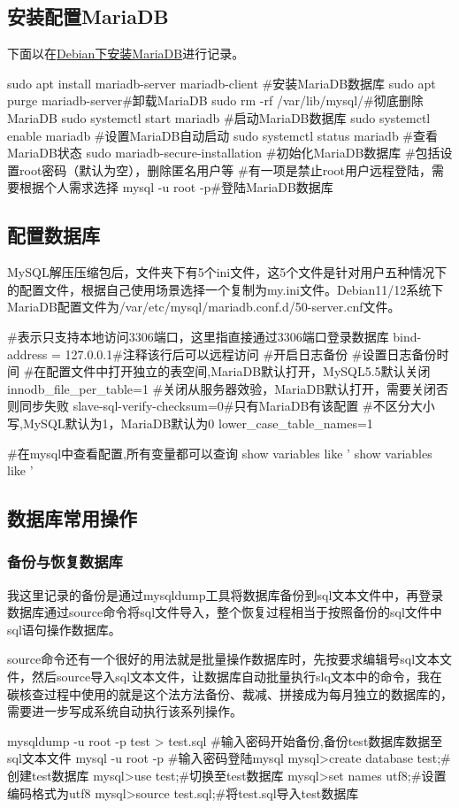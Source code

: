 \subsection{安装配置MariaDB}
下面以在\href{https://blog.csdn.net/erliujian111/article/details/135732876?spm=1001.2014.3001.5506}{Debian下安装MariaDB}进行记录。
\begin{shell}
sudo apt install mariadb-server mariadb-client
#安装MariaDB数据库
sudo apt purge mariadb-server#卸载MariaDB
sudo rm -rf /var/lib/mysql/#彻底删除MariaDB
sudo systemctl start mariadb #启动MariaDB数据库
sudo systemctl enable mariadb #设置MariaDB自动启动
sudo systemctl status mariadb #查看MariaDB状态
sudo mariadb-secure-installation #初始化MariaDB数据库
#包括设置root密码（默认为空），删除匿名用户等
#有一项是禁止root用户远程登陆，需要根据个人需求选择
mysql -u root -p#登陆MariaDB数据库
\end{shell}
\subsection{配置数据库}
MySQL解压压缩包后，文件夹下有5个ini文件，这5个文件是针对用户五种情况下的配置文件，根据自己使用场景选择一个复制为my.ini文件。Debian11/12系统下MariaDB配置文件为/var/etc/mysql/mariadb.conf.d/50-server.cnf文件。
\begin{shell}
#表示只支持本地访问3306端口，这里指直接通过3306端口登录数据库
bind-address = 127.0.0.1#注释该行后可以远程访问
#开启日志备份
#设置日志备份时间
#在配置文件中打开独立的表空间,MariaDB默认打开，MySQL5.5默认关闭
innodb_file_per_table=1
#关闭从服务器效验，MariaDB默认打开，需要关闭否则同步失败
slave-sql-verify-checksum=0#只有MariaDB有该配置
#不区分大小写,MySQL默认为1，MariaDB默认为0
lower_case_table_names=1


#在mysql中查看配置,所有变量都可以查询
show variables like '%
show variables like '%
\end{shell}
\subsection{数据库常用操作}
\subsubsection{备份与恢复数据库}
我这里记录的备份是通过mysqldump工具将数据库备份到sql文本文件中，再登录数据库通过source命令将sql文件导入，整个恢复过程相当于按照备份的sql文件中sql语句操作数据库。

source命令还有一个很好的用法就是批量操作数据库时，先按要求编辑号sql文本文件，然后source导入sql文本文件，让数据库自动批量执行slq文本中的命令，我在碳核查过程中使用的就是这个法方法备份、裁减、拼接成为每月独立的数据库的，需要进一步写成系统自动执行该系列操作。
\begin{shell}
mysqldump -u root -p test > test.sql
#输入密码开始备份,备份test数据库数据至sql文本文件
mysql -u root -p
#输入密码登陆mysql
mysql>create database test;#创建test数据库
mysql>use test;#切换至test数据库
mysql>set names utf8;#设置编码格式为utf8
mysql>source test.sql;#将test.sql导入test数据库
\end{shell}
